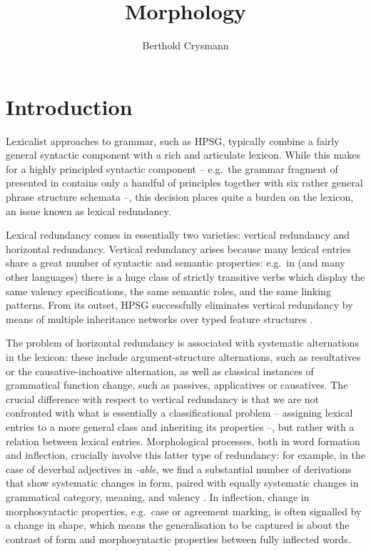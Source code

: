 \documentclass[output=paper
 	        ,biblatex
                ,babelshorthands
                ,newtxmath
                ,draftmode
                ,colorlinks, citecolor=brown
]{langscibook}
\author{Berthold Crysmann\affiliation{CNRS, Laboratoire de
    linguistique formelle, U Paris}
}
\title{Morphology}
\begin{document}
\maketitle

\label{chap-morphology}




\section{Introduction}
\label{morphology-sec:Intro}

Lexicalist approaches to grammar, such as HPSG, typically combine a
fairly general syntactic component with a rich and articulate
lexicon. While this makes for a highly principled syntactic
component -- e.g.\ the grammar fragment of  presented in
\citet{Pollard94} contains only a handful of principles together with
six rather general phrase structure schemata --, this decision places
quite a burden on the lexicon, an issue  known as lexical
redundancy.

Lexical redundancy comes in essentially two varieties: vertical redundancy
and horizontal redundancy. Vertical redundancy arises because many
lexical entries share a great number of syntactic and semantic
properties: e.g.\ in  (and many other languages) there is a huge
class of strictly transitive verbs which display the same valency
specifications, the same semantic roles, and the same linking
patterns. From its outset, HPSG successfully eliminates vertical
redundancy by means of multiple inheritance networks over typed
feature structures \citep{Flickinger:Pollard:ea:85a}.

The problem of horizontal redundancy is associated with systematic
alternations in the lexicon: these include argument-structure
alternations, such as resultatives or the causative-inchoative
alternation, as well as classical instances of grammatical function
change, such as passives, applicatives or causatives. The crucial
difference with respect to vertical redundancy is that we are not
confronted with what is essentially a classificational problem --
assigning lexical entries to a more general class and inheriting its
properties --, but rather with a relation between lexical entries.
Morphological processes, both in word formation and inflection,
crucially involve this latter type of redundancy: for example, in the
case of deverbal adjectives in \textit{-able}, we find a substantial
number of derivations that show systematic changes in form, paired
with equally systematic changes in grammatical category, meaning, and
valency \citep{Riehemann98}. In inflection, change in morphosyntactic
properties, e.g.\ case or agreement marking, is often signalled by a
change in shape, which means the generalisation to be captured is about the
contrast of form and morphosyntactic properties between fully
inflected words.
\end{document}
